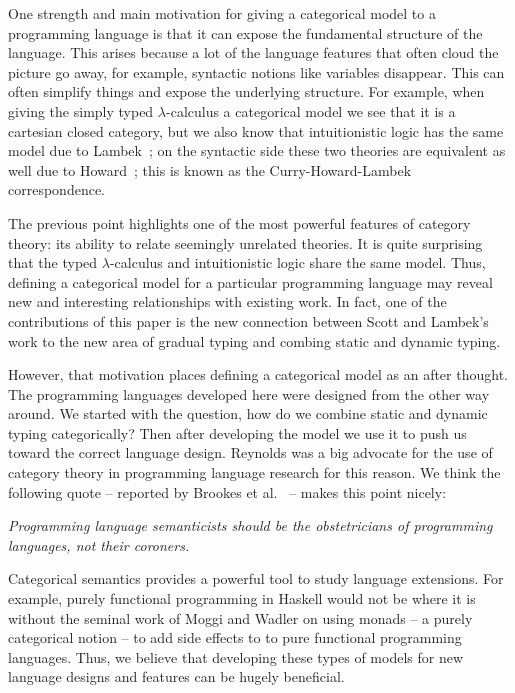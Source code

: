 One strength and main motivation for giving a categorical model to a
programming language is that it can expose the fundamental structure
of the language.  This arises because a lot of the language features
that often cloud the picture go away, for example, syntactic notions
like variables disappear.  This can often simplify things and expose
the underlying structure.  For example, when giving the simply typed
$\lambda$-calculus a categorical model we see that it is a cartesian
closed category, but we also know that intuitionistic logic has the
same model due to Lambek~\cite{Lambek:1980}; on the syntactic side
these two theories are equivalent as well due to
Howard~\cite{Howard:1980}; this is known as the Curry-Howard-Lambek
correspondence.

The previous point highlights one of the most powerful features of
category theory: its ability to relate seemingly unrelated theories.
It is quite surprising that the typed $\lambda$-calculus and
intuitionistic logic share the same model.  Thus, defining a
categorical model for a particular programming language may reveal new
and interesting relationships with existing work.  In fact, one of the
contributions of this paper is the new connection between Scott and
Lambek's work to the new area of gradual typing and combing static and
dynamic typing.

However, that motivation places defining a categorical model as an
after thought.  The programming languages developed here were designed
from the other way around.  We started with the question, how do we
combine static and dynamic typing categorically? Then after developing
the model we use it to push us toward the correct language design.
Reynolds \cite{Brookes:2013} was a big advocate for the use of
category theory in programming language research for this reason.  We
think the following quote -- reported by Brookes et
al.~\cite{Brookes:2013} -- makes this point nicely:
\begin{center}
  \parbox{170pt}{
    \emph{Programming language semanticists should be the obstetricians
    of programming languages, not their coroners.\\
    {}}}
\end{center}

Categorical semantics provides a powerful tool to study language
extensions.  For example, purely functional programming in Haskell
would not be where it is without the seminal work of Moggi and Wadler
\cite{Moggi:1989,Wadler:1995} on using monads -- a purely categorical
notion -- to add side effects to to pure functional programming
languages.  Thus, we believe that developing these types of models for
new language designs and features can be hugely beneficial.

